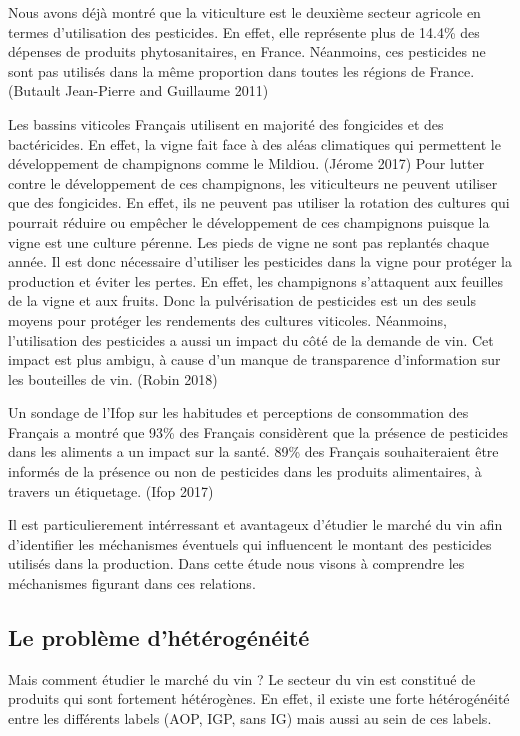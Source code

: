 \documentclass[11pt,]{article}
\begin{document}
Nous avons déjà montré que la viticulture est le deuxième secteur
agricole en termes d'utilisation des pesticides. En effet, elle
représente plus de 14.4\% des dépenses de produits phytosanitaires, en
France. Néanmoins, ces pesticides ne sont pas utilisés dans la même
proportion dans toutes les régions de France. (Butault Jean-Pierre and
Guillaume 2011)

Les bassins viticoles Français utilisent en majorité des fongicides et
des bactéricides. En effet, la vigne fait face à des aléas climatiques
qui permettent le développement de champignons comme le Mildiou. (Jérome
2017) Pour lutter contre le développement de ces champignons, les
viticulteurs ne peuvent utiliser que des fongicides. En effet, ils ne
peuvent pas utiliser la rotation des cultures qui pourrait réduire ou
empêcher le développement de ces champignons puisque la vigne est une
culture pérenne. Les pieds de vigne ne sont pas replantés chaque année.
Il est donc nécessaire d'utiliser les pesticides dans la vigne pour
protéger la production et éviter les pertes. En effet, les champignons
s'attaquent aux feuilles de la vigne et aux fruits. Donc la
pulvérisation de pesticides est un des seuls moyens pour protéger les
rendements des cultures viticoles. Néanmoins, l'utilisation des
pesticides a aussi un impact du côté de la demande de vin. Cet impact
est plus ambigu, à cause d'un manque de transparence d'information sur
les bouteilles de vin. (Robin 2018)

Un sondage de l'Ifop sur les habitudes et perceptions de consommation
des Français a montré que 93\% des Français considèrent que la présence
de pesticides dans les aliments a un impact sur la santé. 89\% des
Français souhaiteraient être informés de la présence ou non de
pesticides dans les produits alimentaires, à travers un étiquetage.
(Ifop 2017)

Il est particulierement intérressant et avantageux d'étudier le marché
du vin afin d'identifier les méchanismes éventuels qui influencent le
montant des pesticides utilisés dans la production. Dans cette étude
nous visons à comprendre les méchanismes figurant dans ces relations.

\hypertarget{le-probleme-dheterogeneite}{%
\subsection{Le problème
d'hétérogénéité}\label{le-probleme-dheterogeneite}}

Mais comment étudier le marché du vin ? Le secteur du vin est constitué
de produits qui sont fortement hétérogènes. En effet, il existe une
forte hétérogénéité entre les différents labels (AOP, IGP, sans IG) mais
aussi au sein de ces labels.
\end{document}
